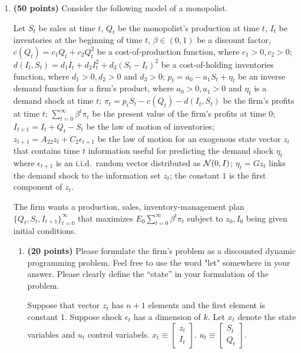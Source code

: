 \documentclass[12pt, oneside]{article}
\begin{document}
\pagestyle{myheadings} 
\begin{enumerate}
\item \textbf{(50 points)}
Consider the following model of a monopolist.  

Let $S_t$ be sales at time $t$, $Q_t$ be the monopolist's production  at time $t$,
 $I_t$ be inventories at the beginning of time $t$,  $\beta \in (0,1)$ be a discount factor, $c(Q_t) = c_1 Q_t + c_2 Q_t^2$ be a cost-of-production function, where $c_1>0, c_2>0$;
  $d(I_t, S_t) = d_1 I_t + d_2 I_t^2  + d_3 (S_t - I_t)^2$ be a cost-of-holding inventories function, where $d_1 >0, d_2 >0 $ and $d_3 >0$;
$p_t = a_0 - a_1 S_t + \eta_t $ be an inverse demand function for a firm's product, where $a_0>0, a_1 >0$ and $\eta_t$ is a demand shock at time  $t$;
   $\pi_t = p_t S_t - c(Q_t) - d(I_t, S_t) $ be the firm's profits at time $t$;
   $\sum_{t=0}^\infty \beta^t \pi_t $ be the present value of the firm's profits at time $0$;  $I_{t+1} = I_t + Q_t - S_t$ be the law of motion of inventories;
 $z_{t+1} = A_{22} z_t + C_2 \epsilon_{t+1} $ be the law of motion for an exogenous state vector $z_t$ that contains time $t$ information useful for predicting the demand shock $\eta_t$ where
 $\epsilon_{t+1}$ is an i.i.d.~random vector distributed as ${\cal N}(0,I)$;
   $\eta_t = G z_t $ links the demand shock to the information set $z_t$;
   the constant $1$ is the first component of $z_t$.

   The firm wants  a production, sales, inventory-management plan $\{Q_t, S_t, I_{t+1}\}_{t=0}^\infty$ that maximizes $E_0 \sum_{t=0}^\infty \beta^t \pi_t $
   subject to $z_0,  I_0 $ being given initial conditions.

\begin{enumerate}
\item \textbf{(20 points)} Please formulate the firm's  problem as a discounted dynamic programming problem.  Feel free to use  the word "let" somewhere in your answer.  Please clearly define the ``state'' in your formulation of the problem.

Suppose that vector $z_t$ has $n+1$ elements and the first element is constant 1. Suppose shock $\epsilon_t$ has a dimension of $k$. Let $x_t$ denote the state variables and $u_t$ control variabels. $x_t \equiv \left [ \begin{array}{c} z_t \\ I_t \end{array} \right ]$. $u_t \equiv \left [ \begin{array}{c} S_t \\ Q_t \end{array} \right ]$.


\end{enumerate}
\end{enumerate}
\end{document}
